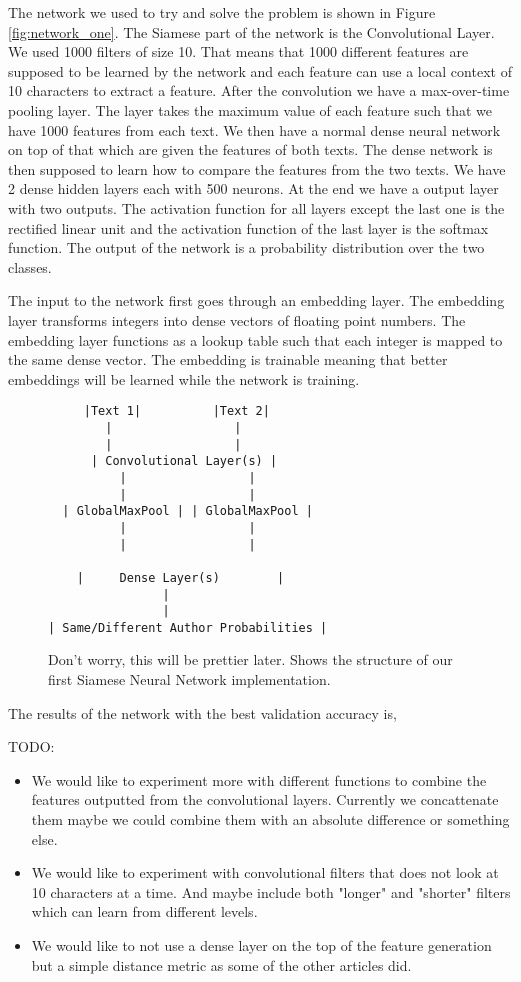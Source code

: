 The network we used to try and solve the problem is shown in Figure
\ref{fig:network_one}. The Siamese part of the network is the Convolutional
Layer. We used 1000 filters of size 10. That means that 1000 different features
are supposed to be learned by the network and each feature can use a local
context of 10 characters to extract a feature. After the convolution we have a
max-over-time pooling layer. The layer takes the maximum value of each feature
such that we have 1000 features from each text. We then have a normal dense
neural network on top of that which are given the features of both texts. The
dense network is then supposed to learn how to compare the features from the
two texts. We have 2 dense hidden layers each with 500 neurons. At the end we
have a output layer with two outputs. The activation function for all layers
except the last one is the rectified linear unit and the activation function of
the last layer is the softmax function. The output of the network is a
probability distribution over the two classes.

The input to the network first goes through an embedding layer. The embedding
layer transforms integers into dense vectors of floating point numbers. The
embedding layer functions as a lookup table such that each integer is mapped
to the same dense vector. The embedding is trainable meaning that better
embeddings will be learned while the network is training.

\begin{figure}[htb]
\begin{lstlisting}
     |Text 1|          |Text 2|
        |                 |
        |                 |
      | Convolutional Layer(s) |
          |                 |
          |                 |
  | GlobalMaxPool | | GlobalMaxPool |
          |                 |
          |                 |

    |     Dense Layer(s)        |
                |
                |
| Same/Different Author Probabilities |
\end{lstlisting}
\caption{Don't worry, this will be prettier later. Shows the structure of our
    first Siamese Neural Network implementation.}
\end{figure}

The results of the network with the best validation accuracy is,

TODO:
\begin{itemize}
    \item We would like to experiment more with different functions to combine
        the features outputted from the convolutional layers. Currently we
        concattenate them maybe we could combine them with an absolute
        difference or something else.
    \item We would like to experiment with convolutional filters that does not
        look at 10 characters at a time. And maybe include both "longer" and
        "shorter" filters which can learn from different levels.
    \item We would like to not use a dense layer on the top of the feature
        generation but a simple distance metric as some of the other articles
        did.
\end{itemize}
